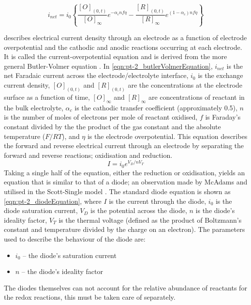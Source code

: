       \begin{equation}
        i_{net} = i_{0} \left\{ \frac{[O]_{(0,t)}}{[O]_{\infty}}e^{-\alpha_{c}nf\eta} - \frac{[R]_{(0,t)}}{[R]_{\infty}}e^{(1-\alpha_{c})nf\eta}\right\}
        \label{eqn:pt-2_butlerVolmerEquation}
      \end{equation}

       describes electrical current density through an electrode as a function of electrode overpotential and the cathodic and anodic reactions occurring at each electrode.
      It is called the current-overpotential equation and is derived from the more general Butler-Volmer equation \cite{Merrill2005,ScottSingle2013}.
      In \cref{eqn:pt-2_butlerVolmerEquation}, $i_{net}$ is the net Faradaic current across the electrode/electrolyte interface,
      $i_{0}$ is the exchange current density,
      $[O]_{(0,t)}$ and $[R]_{(0,t)}$ are the concentrations at the electrode surface as a function of time,
      $[O]_{\infty}$ and $[R]_{\infty}$ are concentrations of reactant in the bulk electrolyte,
      $\alpha_{c}$ is the cathodic transfer coefficient (approximately 0.5),
      $n$ is the number of moles of electrons per mole of reactant oxidised,
      $f$ is Faraday's constant divided by the the product of the gas constant and the absolute temperature ($F/RT$),
      and $\eta$ is the electrode overpotential.
      This equation describes the forward and reverse electrical current through an electrode by separating the forward and reverse reactions; oxidisation and reduction.
      \begin{equation}
        I = i_0 e^{V_D / n V_T}
        \label{eqn:pt-2_diodeEquation}
      \end{equation}
      Taking a single half of the equation, either the reduction or oxidisation, yields an equation that is similar to that of a diode; an observation made by McAdams and utilised in the Scott-Single model \cite{McAdams1995}.
      The standard diode equation is shown as \cref{eqn:pt-2_diodeEquation}, where
      $I$ is the current through the diode,
      $i_0$ is the diode saturation current,
      $V_D$ is the potential across the diode,
      $n$ is the diode's ideality factor,
      $V_T$ is the thermal voltage (defined as the product of Boltzmann's constant and temperature divided by the charge on an electron).
      The parameters used to describe the behaviour of the diode are:
      \begin{itemize}
        \item $i_0$ -- the diode's saturation current
        \item $n$ -- the diode's ideality factor
      \end{itemize}
      The diodes themselves can not account for the relative abundance of reactants for the redox reactions, this must be taken care of separately.

